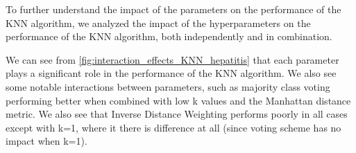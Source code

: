 To further understand the impact of the parameters on the performance of the KNN algorithm,
we analyzed the impact of the hyperparameters on the performance of the KNN algorithm, both independently and in combination.

We can see from \autoref{fig:interaction_effects_KNN_hepatitis} that each parameter plays a significant role in the performance of the KNN algorithm.
We also see some notable interactions between parameters, such as majority class voting performing better when combined with low k values and the Manhattan distance metric.
We also see that Inverse Distance Weighting performs poorly in all cases except with k=1, where it there is difference at all (since voting scheme has no impact when k=1).
